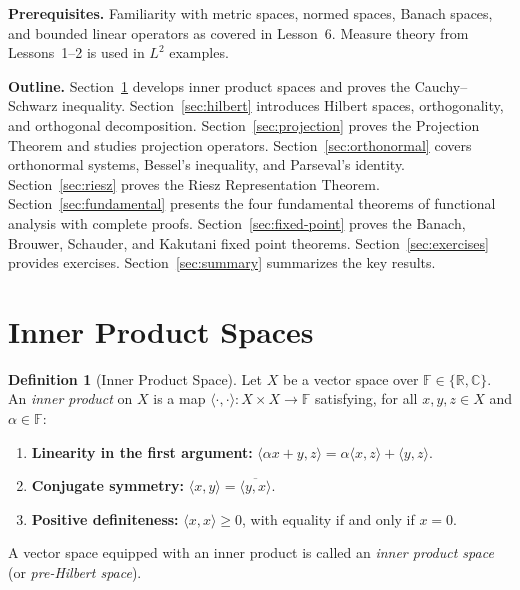 \documentclass[11pt,a4paper]{article}
\theoremstyle{definition}
\newtheorem{definition}{Definition}[section]
\theoremstyle{plain}
\theoremstyle{remark}
\newcommand{\R}{\mathbb{R}}
\newcommand{\C}{\mathbb{C}}
\begin{document}
\medskip
\noindent\textbf{Prerequisites.} Familiarity with metric spaces, normed spaces,
Banach spaces, and bounded linear operators as covered in Lesson~6. Measure
theory from Lessons~1--2 is used in $L^2$ examples.

\medskip
\noindent\textbf{Outline.}
Section~\ref{sec:inner-product} develops inner product spaces and proves the
Cauchy--Schwarz inequality.
Section~\ref{sec:hilbert} introduces Hilbert spaces, orthogonality, and
orthogonal decomposition.
Section~\ref{sec:projection} proves the Projection Theorem and studies
projection operators.
Section~\ref{sec:orthonormal} covers orthonormal systems, Bessel's inequality,
and Parseval's identity.
Section~\ref{sec:riesz} proves the Riesz Representation Theorem.
Section~\ref{sec:fundamental} presents the four fundamental theorems of
functional analysis with complete proofs.
Section~\ref{sec:fixed-point} proves the Banach, Brouwer, Schauder, and
Kakutani fixed point theorems.
Section~\ref{sec:exercises} provides exercises.
Section~\ref{sec:summary} summarizes the key results.


\section{Inner Product Spaces}\label{sec:inner-product}

\begin{definition}[Inner Product Space]\label{def:inner-product}
Let $X$ be a vector space over $\mathbb{F} \in \{\R, \C\}$. An
\emph{inner product} on $X$ is a map
$\langle \cdot, \cdot \rangle \colon X \times X \to \mathbb{F}$ satisfying,
for all $x, y, z \in X$ and $\alpha \in \mathbb{F}$:
\begin{enumerate}[label=(\roman*)]
    \item \textbf{Linearity in the first argument:}
          $\langle \alpha x + y, z \rangle = \alpha \langle x, z \rangle
          + \langle y, z \rangle$.
    \item \textbf{Conjugate symmetry:}
          $\langle x, y \rangle = \overline{\langle y, x \rangle}$.
    \item \textbf{Positive definiteness:}
          $\langle x, x \rangle \geq 0$, with equality if and only if $x = 0$.
\end{enumerate}
A vector space equipped with an inner product is called an
\emph{inner product space} (or \emph{pre-Hilbert space}).
\end{definition}
\end{document}
